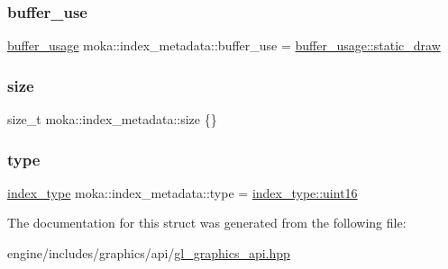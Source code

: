 \subsubsection{\texorpdfstring{buffer\_use}{buffer\_use}}
{\footnotesize\ttfamily \mbox{\hyperlink{namespacemoka_a4799e695da8b173f75809387af8abed7}{buffer\+\_\+usage}} moka\+::index\+\_\+metadata\+::buffer\+\_\+use = \mbox{\hyperlink{namespacemoka_a4799e695da8b173f75809387af8abed7a189a433f29705bbe60128483495ddfd9}{buffer\+\_\+usage\+::static\+\_\+draw}}}

\mbox{\label{structmoka_1_1index__metadata_a496fdc79a8d79892d3e673fbf9e1cbea}} 
\subsubsection{\texorpdfstring{size}{size}}
{\footnotesize\ttfamily size\+\_\+t moka\+::index\+\_\+metadata\+::size \{\}}

\mbox{\label{structmoka_1_1index__metadata_aa38931c3e20da32eb67833ca691c8473}} 
\subsubsection{\texorpdfstring{type}{type}}
{\footnotesize\ttfamily \mbox{\hyperlink{namespacemoka_a32244b0de63481283738e2db11639e3f}{index\+\_\+type}} moka\+::index\+\_\+metadata\+::type = \mbox{\hyperlink{namespacemoka_a32244b0de63481283738e2db11639e3faa00ef2ef85ff67b7b39339886f19044f}{index\+\_\+type\+::uint16}}}



The documentation for this struct was generated from the following file\+:\begin{DoxyCompactItemize}
\item 
engine/includes/graphics/api/\mbox{\hyperlink{gl__graphics__api_8hpp}{gl\+\_\+graphics\+\_\+api.\+hpp}}\end{DoxyCompactItemize}
